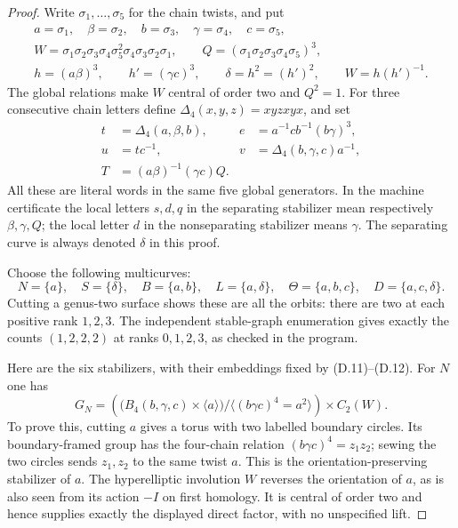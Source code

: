 \begin{proof}
Write $\sigma_1,\ldots,\sigma_5$ for the chain twists, and put
\[
\begin{gathered}
 a=\sigma_1,\quad \beta=\sigma_2,\quad b=\sigma_3,
 \quad\gamma=\sigma_4,\quad c=\sigma_5,\\
 W=\sigma_1\sigma_2\sigma_3\sigma_4\sigma_5^2
       \sigma_4\sigma_3\sigma_2\sigma_1,\qquad
 Q=(\sigma_1\sigma_2\sigma_3\sigma_4\sigma_5)^3,\\
 h=(a\beta)^3,\qquad h'=(\gamma c)^3,\qquad
 \delta=h^2=(h')^2,\qquad W=h(h')^{-1}.
\end{gathered}                                                    \tag{D.11}
\]
The global relations make $W$ central of order two and
$Q^2=1$.  For three consecutive chain letters define
$\Delta_4(x,y,z)=xyzxyx$, and set
\[
\begin{aligned}
 t&=\Delta_4(a,\beta,b),&
 e&=a^{-1}cb^{-1}(b\gamma)^3,\\
 u&=tc^{-1},&v&=\Delta_4(b,\gamma,c)a^{-1},\\
 T&=(a\beta)^{-1}(\gamma c)Q.
\end{aligned}                                                       \tag{D.12}
\]
All these are literal words in the same five global generators.
In the machine certificate the local letters $s,d,q$ in the
separating stabilizer mean respectively $\beta,\gamma,Q$;
the local letter $d$ in the nonseparating stabilizer means
$\gamma$.  The separating curve is always denoted $\delta$
in this proof.

Choose the following multicurves:
\[
 N=\{a\},\quad S=\{\delta\},\quad B=\{a,b\},\quad
 L=\{a,\delta\},\quad
 \Theta=\{a,b,c\},\quad D=\{a,c,\delta\}.                    \tag{D.13}
\]
Cutting a genus-two surface shows these are all the orbits:
there are two at each positive rank $1,2,3$.  The independent
stable-graph enumeration gives exactly the counts
$(1,2,2,2)$ at ranks $0,1,2,3$, as checked in the program.

Here are the six stabilizers, with their embeddings fixed
by (D.11)--(D.12).  For $N$ one has
\[
 G_N=\left(
 \bigl(B_4(b,\gamma,c)\times\langle a\rangle\bigr)
 /\langle(b\gamma c)^4=a^2\rangle\right)
 \times C_2(W).                                                \tag{D.14}
\]
To prove this, cutting $a$ gives a torus with two labelled
boundary circles.  Its boundary-framed group has the
four-chain relation $(b\gamma c)^4=z_1z_2$; sewing the two
circles sends $z_1,z_2$ to the same twist $a$.  This is the
orientation-preserving stabilizer of $a$.  The hyperelliptic
involution $W$ reverses the orientation of $a$, as is also
seen from its action $-I$ on first homology.  It is central
of order two and hence supplies exactly the displayed
direct factor, with no unspecified lift.


\end{proof}
